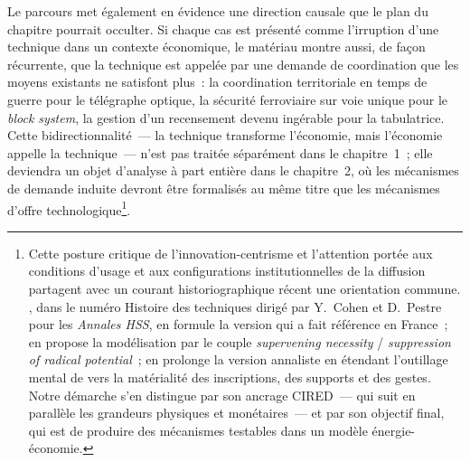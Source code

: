 Le parcours met également en évidence une direction causale que le plan du chapitre pourrait occulter. Si chaque cas est présenté comme l'irruption d'une technique dans un contexte économique, le matériau montre aussi, de façon récurrente, que la technique est appelée par une demande de coordination que les moyens existants ne satisfont plus~: la coordination territoriale en temps de guerre pour le télégraphe optique, la sécurité ferroviaire sur voie unique pour le \emph{block system}, la gestion d'un recensement devenu ingérable pour la tabulatrice. Cette bidirectionnalité~--- la technique transforme l'économie, mais l'économie appelle la technique~--- n'est pas traitée séparément dans le chapitre~1~; elle deviendra un objet d'analyse à part entière dans le chapitre~2, où les mécanismes de demande induite devront être formalisés au même titre que les mécanismes d'offre technologique\footnote{Cette posture critique de l'innovation-centrisme et l'attention portée aux conditions d'usage et aux configurations institutionnelles de la diffusion partagent avec un courant historiographique récent une orientation commune. \textcite{edgerton_innovation_1998}, dans le numéro \og Histoire des techniques\fg{} dirigé par Y.~Cohen et D.~Pestre pour les \emph{Annales HSS}, en formule la version qui a fait référence en France~; \textcite{winston_media_1998} en propose la modélisation par le couple \og \emph{supervening necessity}\fg{} / \og \emph{suppression of radical potential}\fg{}~; \textcite{gardey_ecrire_2008} en prolonge la version annaliste en étendant l'\og outillage mental\fg{} de \textcite{febvre_outillage_1938} vers la matérialité des inscriptions, des supports et des gestes. Notre démarche s'en distingue par son ancrage CIRED~--- qui suit en parallèle les grandeurs physiques et monétaires~--- et par son objectif final, qui est de produire des mécanismes testables dans un modèle énergie-économie.}.

